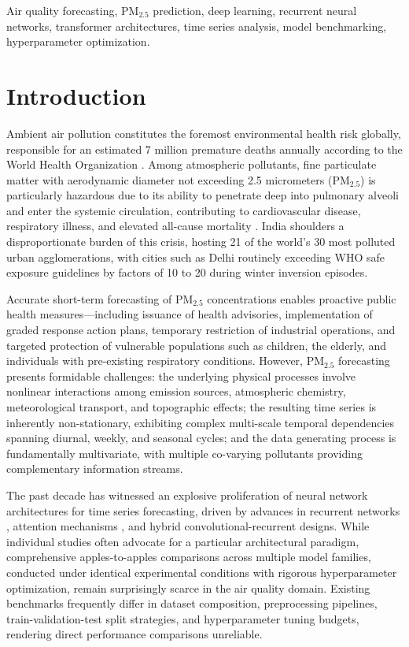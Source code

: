 \documentclass[conference]{IEEEtran}
\begin{document}
\begin{IEEEkeywords}
Air quality forecasting, PM$_{2.5}$ prediction, deep learning, recurrent neural networks, transformer architectures, time series analysis, model benchmarking, hyperparameter optimization.
\end{IEEEkeywords}

\section{Introduction}

Ambient air pollution constitutes the foremost environmental health risk globally, responsible for an estimated 7 million premature deaths annually according to the World Health Organization \cite{who2021}. Among atmospheric pollutants, fine particulate matter with aerodynamic diameter not exceeding 2.5 micrometers (PM$_{2.5}$) is particularly hazardous due to its ability to penetrate deep into pulmonary alveoli and enter the systemic circulation, contributing to cardiovascular disease, respiratory illness, and elevated all-cause mortality \cite{cohen2017}. India shoulders a disproportionate burden of this crisis, hosting 21 of the world's 30 most polluted urban agglomerations, with cities such as Delhi routinely exceeding WHO safe exposure guidelines by factors of 10 to 20 during winter inversion episodes.

Accurate short-term forecasting of PM$_{2.5}$ concentrations enables proactive public health measures---including issuance of health advisories, implementation of graded response action plans, temporary restriction of industrial operations, and targeted protection of vulnerable populations such as children, the elderly, and individuals with pre-existing respiratory conditions. However, PM$_{2.5}$ forecasting presents formidable challenges: the underlying physical processes involve nonlinear interactions among emission sources, atmospheric chemistry, meteorological transport, and topographic effects; the resulting time series is inherently non-stationary, exhibiting complex multi-scale temporal dependencies spanning diurnal, weekly, and seasonal cycles; and the data generating process is fundamentally multivariate, with multiple co-varying pollutants providing complementary information streams.

The past decade has witnessed an explosive proliferation of neural network architectures for time series forecasting, driven by advances in recurrent networks \cite{hochreiter1997}, attention mechanisms \cite{vaswani2017}, and hybrid convolutional-recurrent designs. While individual studies often advocate for a particular architectural paradigm, comprehensive apples-to-apples comparisons across multiple model families, conducted under identical experimental conditions with rigorous hyperparameter optimization, remain surprisingly scarce in the air quality domain. Existing benchmarks frequently differ in dataset composition, preprocessing pipelines, train-validation-test split strategies, and hyperparameter tuning budgets, rendering direct performance comparisons unreliable.
\end{document}
